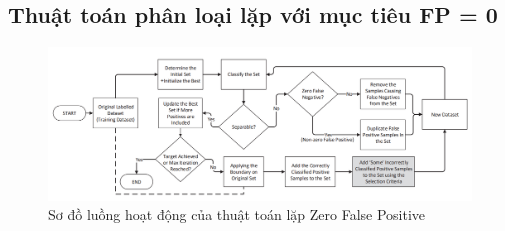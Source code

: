 \documentclass[./../main.tex]{subfiles}
\begin{document}
\subsection{Thuật toán phân loại lặp với mục tiêu FP = 0}
\begin{figure}[ht!]
	\includegraphics[width=\linewidth]{./images/zfp_flow_chart.png}
	\caption{Sơ đồ luồng hoạt động của thuật toán lặp Zero False Positive}
	\label{fig:zfp_flow_chart}
\end{figure}
\end{document}
